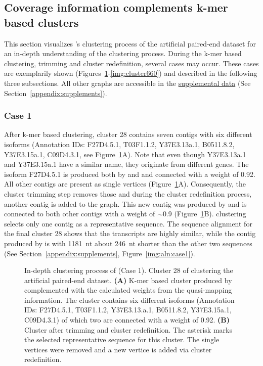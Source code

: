 \documentclass[12pt,a4paper,english]{article}
\begin{document}
	\subsection{Coverage information complements k-mer based clusters}
	\label{ssec:graphs}
	This section visualizes \karma{}'s clustering process of the artificial paired-end \celegans dataset for an in-depth understanding of the clustering process. During the k-mer based clustering, trimming and cluster redefinition, several cases may occur. These cases are exemplarily shown (Figures~\ref{img:cluster28}-\ref{img:cluster660}) and described in the following three subsections. All other graphs are accessible in the \href{https://github.com/lmfaber/master_thesis/tree/master/supplemental_data/graphs}{supplemental data} (See Section~\ref{appendix:supplements}).
	
	\subsubsection*{Case 1}
        After k-mer based clustering, cluster 28 contains seven contigs with six different isoforms (Annotation IDs: F27D4.5.1, T03F1.1.2, Y37E3.13a.1, B0511.8.2, Y37E3.15a.1, C09D4.3.1, see Figure~\ref{img:cluster28}A). 
        Note that even though Y37E3.13a.1 and Y37E3.15a.1 have a similar name, they originate from different genes. The isoform F27D4.5.1 is produced both by \spades and \trinity and connected with a weight of 0.92. All other contigs are present as single vertices (Figure~\ref{img:cluster28}A). Consequently, the cluster trimming step removes those and during the cluster redefinition process, another contig is added to the graph. This new contig was produced by \soap and is connected to both other contigs with a weight of $\sim$0.9 (Figure~\ref{img:cluster28}B). \mcl clustering selects only one contig as a representative sequence. 
        The sequence alignment for the final cluster 28 shows that the transcripts are highly similar, while the contig produced by \soap is with 1181~nt about 246~nt shorter than the other two sequences (See Section~\ref{appendix:supplements}, Figure~\ref{img:aln:case1}).

		\begin{figure}[H]
			\centering
			\def\svgwidth{\textwidth}
			
			\caption[In-depth clustering process of \karma (Case 1).]{In-depth clustering process of \karma (Case 1). Cluster 28 of clustering the artificial paired-end dataset. \textbf{(A)} K-mer based cluster produced by \hdbscan complemented with the calculated weights from the quasi-mapping information. The cluster contains six different isoforms (Annotation IDs: F27D4.5.1, T03F1.1.2, Y37E3.13.a.1, B0511.8.2, Y37E3.15a.1, C09D4.3.1) of which two are connected with a weight of 0.92. \textbf{(B)} Cluster after trimming and cluster redefinition. The asterisk marks the selected representative sequence for this cluster. The single vertices were removed and a new vertice is added via cluster redefinition.}
			\label{img:cluster28}
		\end{figure}
		
\end{document}
